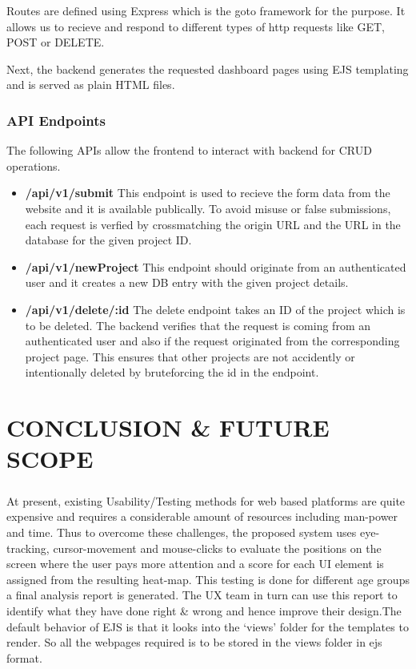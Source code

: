 \documentclass[hidelinks,12pt,a4paper,final]{extreport}
\begin{document}
Routes are defined using Express which is the goto framework for the purpose. It allows us to recieve and respond to different types of http requests like GET, POST or DELETE. 

Next, the backend generates the requested dashboard pages using EJS templating and is served as plain HTML files.

\subsection{API Endpoints}
The following APIs allow the frontend to interact with backend for CRUD operations.
\begin{itemize}
    \item \textbf{/api/v1/submit} This endpoint is used to recieve the form data from the website and it is available publically. To avoid misuse or false submissions, each request is verfied by crossmatching the origin URL and the URL in the database for the given project ID.
    \item \textbf{/api/v1/newProject} This endpoint should originate from an authenticated user and it creates a new DB entry with the given project details.
    \item \textbf{/api/v1/delete/:id} The delete endpoint takes an ID of the project which is to be deleted. The backend verifies that the request is coming from an authenticated user and also if the request originated from the corresponding project page. This ensures that other projects are not accidently or intentionally deleted by bruteforcing the id in the endpoint.
\end{itemize}

\newpage
\chapter{CONCLUSION \& FUTURE SCOPE}
\paragraph{}
At present, existing Usability/\-Testing methods for web based platforms are quite expensive and requires a considerable amount of resources including man-power and time.
Thus to overcome these challenges, the proposed system uses eye-tracking, cursor-movement and mouse-clicks to evaluate the positions on the screen where the user pays more attention and a score for each UI element is assigned from the resulting heat-map.
This testing is done for different age groups a final analysis report is generated. The UX team in turn can use this report to identify what they have done right \& wrong and hence improve their design.The default behavior of EJS is that it looks into the ‘views’ folder for the templates to render. So all the webpages required is to be stored in the views folder in ejs format.
\end{document}

